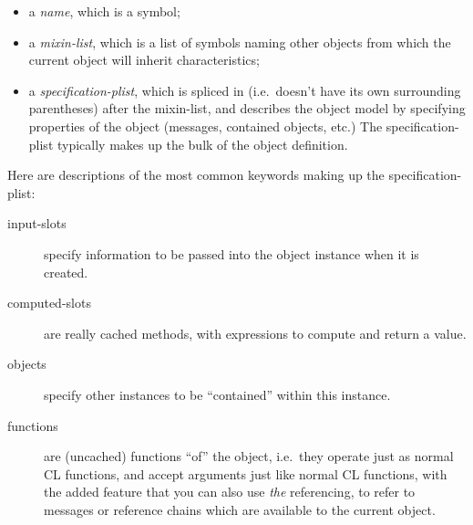 \documentclass [11pt]{book}
\begin{document}
\begin{itemize}

\item a \emph{name}, which is a symbol;

\item a \emph{mixin-list}, which is a list of symbols naming other objects from which the current object 
will inherit characteristics;

\item a \emph{specification-plist}, which is spliced in (i.e.\ doesn't have its own surrounding 
parentheses) after the mixin-list, and describes
the object model by specifying properties of the object (messages, contained objects, etc.)
The specification-plist typically makes up the bulk of the object definition.

\end{itemize}



Here are descriptions of the most common keywords making up the specification-plist:

\begin{description}

\item [input-slots]
specify information to be passed into the object instance when it is created.

\item [computed-slots]
are really cached methods, with expressions to compute and return a value.

\item [objects]
specify other instances to be ``contained'' within this instance.

\item [functions]
are (uncached) functions ``of'' the object, i.e.\ they
operate just as normal CL functions, and accept arguments just like
normal CL functions, with the added feature that you can also use \emph{the} referencing, to refer to messages or reference chains
	  which are available to the current object.

\end{description}
\end{document}
